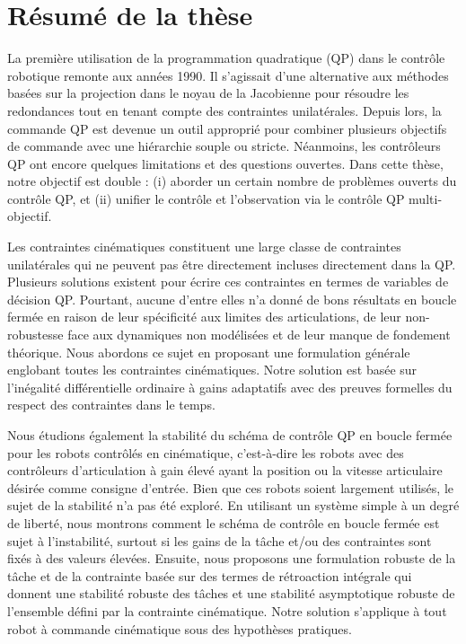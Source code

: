 \chapter*{R\'esum\'e de la th\`ese}
La première utilisation de la programmation quadratique (QP) dans le contrôle robotique remonte aux années 1990. Il s'agissait d'une alternative aux méthodes basées sur la projection dans le noyau de la Jacobienne pour résoudre les redondances tout en tenant compte des contraintes unilatérales. Depuis lors, la commande QP est devenue un outil approprié pour combiner plusieurs objectifs de commande avec une hiérarchie souple ou stricte. Néanmoins, les contrôleurs QP ont encore quelques limitations et des questions ouvertes. Dans cette thèse, notre objectif est double : (i) aborder un certain nombre de problèmes ouverts du contrôle QP, et (ii) unifier le contrôle et l'observation via le contrôle QP multi-objectif.

Les contraintes cinématiques constituent une large classe de contraintes unilatérales qui ne peuvent pas être directement incluses directement dans la QP. Plusieurs solutions existent pour écrire ces contraintes en termes de variables de décision QP. Pourtant, aucune d'entre elles n'a donné de bons résultats en boucle fermée en raison de leur spécificité aux limites des articulations, de leur non-robustesse face aux dynamiques non modélisées et de leur manque de fondement théorique. Nous abordons ce sujet en proposant une formulation générale englobant toutes les contraintes cinématiques. Notre solution est basée sur l'inégalité différentielle ordinaire à gains adaptatifs avec des preuves formelles du respect des contraintes dans le temps.

Nous étudions également la stabilité du schéma de contrôle QP en boucle fermée pour les robots contrôlés en cinématique, c'est-à-dire les robots avec des contrôleurs d'articulation à gain élevé ayant la position ou la vitesse articulaire désirée comme consigne d'entrée. Bien que ces robots soient largement utilisés, le sujet de la stabilité n'a pas été exploré. En utilisant un système simple à un degré de liberté, nous montrons comment le schéma de contrôle en boucle fermée est sujet à l'instabilité, surtout si les gains de la tâche et/ou des contraintes sont fixés à des valeurs élevées. Ensuite, nous proposons une formulation robuste de la tâche et de la contrainte basée sur des termes de rétroaction intégrale qui donnent une stabilité robuste des tâches et une stabilité asymptotique robuste de l'ensemble défini par la contrainte cinématique. Notre solution s'applique à tout robot à commande cinématique sous des hypothèses pratiques.

